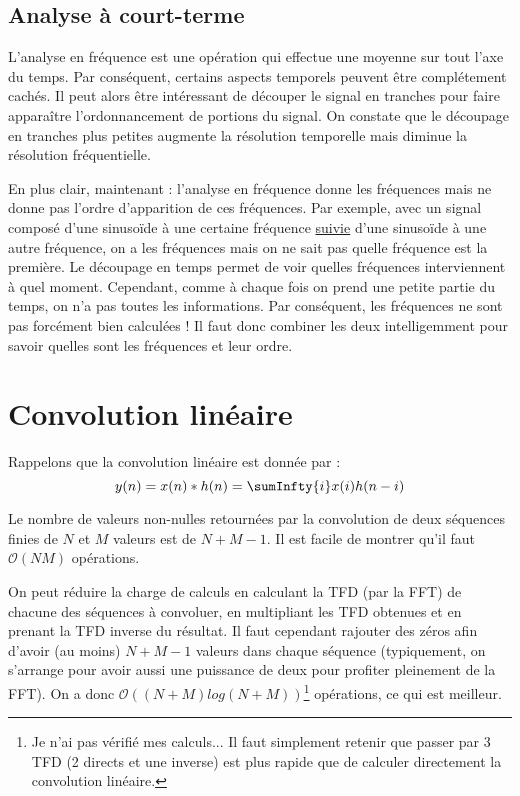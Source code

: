         \subsection{Analyse à court-terme}
            L'analyse en fréquence est une opération qui effectue une moyenne sur tout l'axe du temps. Par conséquent, certains aspects temporels peuvent être complétement cachés. Il peut alors être intéressant de découper le signal en tranches pour faire apparaître l'ordonnancement de portions du signal. On constate que le découpage en tranches plus petites augmente la résolution temporelle mais diminue la résolution fréquentielle.

            En plus clair, maintenant : l'analyse en fréquence donne les fréquences mais ne donne pas l'ordre d'apparition de ces fréquences. Par exemple, avec un signal composé d'une sinusoïde à une certaine fréquence \underline{suivie} d'une sinusoïde à une autre fréquence, on a les fréquences mais on ne sait pas quelle fréquence est la première. Le découpage en temps permet de voir quelles fréquences interviennent à quel moment. Cependant, comme à chaque fois on prend une petite partie du temps, on n'a pas toutes les informations. Par conséquent, les fréquences ne sont pas forcément bien calculées ! Il faut donc combiner les deux intelligemment pour savoir quelles sont les fréquences et leur ordre.

    \section{Convolution linéaire}
        Rappelons que la convolution linéaire est donnée par :
        $$
            y(n) = x(n) * h(n) = \sumInfty{i} x(i)h(n-i)
        $$

        Le nombre de valeurs non-nulles retournées par la convolution de deux séquences finies de $N$ et $M$ valeurs est de $N + M - 1$. Il est facile de montrer qu'il faut $\mathcal{O}(NM)$ opérations.

        On peut réduire la charge de calculs en calculant la TFD (par la FFT) de chacune des séquences à convoluer, en multipliant les TFD obtenues et en prenant la TFD inverse du résultat. Il faut cependant rajouter des zéros afin d'avoir (au moins) $N + M - 1$ valeurs dans chaque séquence (typiquement, on s'arrange pour avoir aussi une puissance de deux pour profiter pleinement de la FFT). On a donc $\mathcal{O}((N+M)log(N+M))$\footnote{Je n'ai pas vérifié mes calculs... Il faut simplement retenir que passer par 3 TFD (2 directs et une inverse) est plus rapide que de calculer directement la convolution linéaire.} opérations, ce qui est meilleur.

